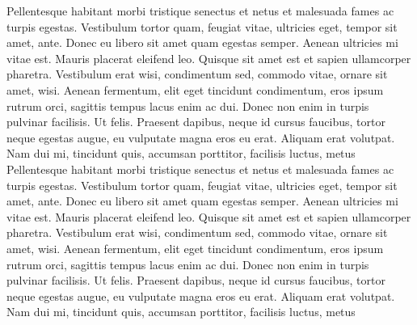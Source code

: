 Pellentesque habitant morbi tristique senectus et netus et malesuada fames ac turpis egestas. Vestibulum tortor quam, feugiat vitae, ultricies eget, tempor sit amet, ante. Donec eu libero sit amet quam egestas semper. Aenean ultricies mi vitae est. Mauris placerat eleifend leo. Quisque sit amet est et sapien ullamcorper pharetra. Vestibulum erat wisi, condimentum sed, commodo vitae, ornare sit amet, wisi. Aenean fermentum, elit eget tincidunt condimentum, eros ipsum rutrum orci, sagittis tempus lacus enim ac dui. Donec non enim in turpis pulvinar facilisis. Ut felis. Praesent dapibus, neque id cursus faucibus, tortor neque egestas augue, eu vulputate magna eros eu erat. Aliquam erat volutpat. Nam dui mi, tincidunt quis, accumsan porttitor, facilisis luctus, metus
Pellentesque habitant morbi tristique senectus et netus et malesuada fames ac turpis egestas. Vestibulum tortor quam, feugiat vitae, ultricies eget, tempor sit amet, ante. Donec eu libero sit amet quam egestas semper. Aenean ultricies mi vitae est. Mauris placerat eleifend leo. Quisque sit amet est et sapien ullamcorper pharetra. Vestibulum erat wisi, condimentum sed, commodo vitae, ornare sit amet, wisi. Aenean fermentum, elit eget tincidunt condimentum, eros ipsum rutrum orci, sagittis tempus lacus enim ac dui. Donec non enim in turpis pulvinar facilisis. Ut felis. Praesent dapibus, neque id cursus faucibus, tortor neque egestas augue, eu vulputate magna eros eu erat. Aliquam erat volutpat. Nam dui mi, tincidunt quis, accumsan porttitor, facilisis luctus, metus

